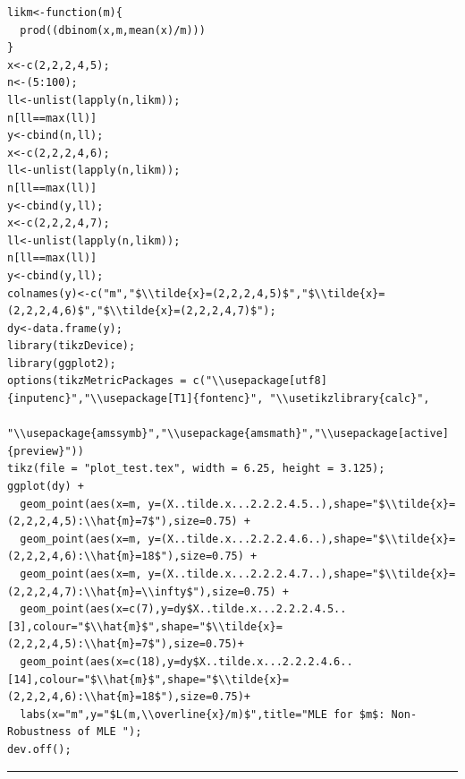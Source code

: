 \documentclass[]{book}
\theoremstyle{definition}
\theoremstyle{definition}
\theoremstyle{definition}
\theoremstyle{remark}
\begin{document}
\hypertarget{toggleCodeFreq.3}{}
\begin{verbatim}
likm<-function(m){
  prod((dbinom(x,m,mean(x)/m)))
}
x<-c(2,2,2,4,5);
n<-(5:100);
ll<-unlist(lapply(n,likm));
n[ll==max(ll)]
y<-cbind(n,ll);
x<-c(2,2,2,4,6);
ll<-unlist(lapply(n,likm));
n[ll==max(ll)]
y<-cbind(y,ll);
x<-c(2,2,2,4,7);
ll<-unlist(lapply(n,likm));
n[ll==max(ll)]
y<-cbind(y,ll);
colnames(y)<-c("m","$\\tilde{x}=(2,2,2,4,5)$","$\\tilde{x}=(2,2,2,4,6)$","$\\tilde{x}=(2,2,2,4,7)$");
dy<-data.frame(y);
library(tikzDevice);
library(ggplot2);
options(tikzMetricPackages = c("\\usepackage[utf8]{inputenc}","\\usepackage[T1]{fontenc}", "\\usetikzlibrary{calc}",
                               "\\usepackage{amssymb}","\\usepackage{amsmath}","\\usepackage[active]{preview}"))
tikz(file = "plot_test.tex", width = 6.25, height = 3.125);
ggplot(dy) +
  geom_point(aes(x=m, y=(X..tilde.x...2.2.2.4.5..),shape="$\\tilde{x}=(2,2,2,4,5):\\hat{m}=7$"),size=0.75) +
  geom_point(aes(x=m, y=(X..tilde.x...2.2.2.4.6..),shape="$\\tilde{x}=(2,2,2,4,6):\\hat{m}=18$"),size=0.75) +
  geom_point(aes(x=m, y=(X..tilde.x...2.2.2.4.7..),shape="$\\tilde{x}=(2,2,2,4,7):\\hat{m}=\\infty$"),size=0.75) +
  geom_point(aes(x=c(7),y=dy$X..tilde.x...2.2.2.4.5..[3],colour="$\\hat{m}$",shape="$\\tilde{x}=(2,2,2,4,5):\\hat{m}=7$"),size=0.75)+
  geom_point(aes(x=c(18),y=dy$X..tilde.x...2.2.2.4.6..[14],colour="$\\hat{m}$",shape="$\\tilde{x}=(2,2,2,4,6):\\hat{m}=18$"),size=0.75)+
  labs(x="m",y="$L(m,\\overline{x}/m)$",title="MLE for $m$: Non-Robustness of MLE ");
dev.off();
\end{verbatim}

\begin{center}\rule{0.5\linewidth}{\linethickness}\end{center}
\end{document}
